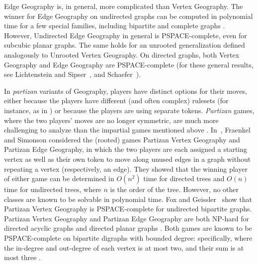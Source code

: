 \documentclass{article}
\theoremstyle{plain}
\theoremstyle{definition}
\begin{document}
{\sc Edge Geography} is, in general, more complicated than {\sc Vertex Geography.} The winner for {\sc Edge Geography} on undirected graphs can be computed in polynomial time for a few special families, including bipartite and complete graphs \cite{FSU93}. However, {\sc Undirected Edge Geography} in general is PSPACE-complete, even for subcubic planar graphs. The same holds for an unrooted generalization defined analogously to {\sc Unrooted Vertex Geography.} On directed graphs, both {\sc Vertex Geography} and {\sc Edge Geography} are PSPACE-complete (for these general results, see Lichtenstein and Sipser~\cite{LS80}, and Schaefer~\cite{Schaefer78}). 

In \emph{partizan} variants of Geography, players have distinct options for their moves, either because the players have different (and often complex) rulesets (for instance, as in \cite{Bosboom2020}) or because the players are using separate tokens. \emph{Partizan} games, where the two players' moves are no longer symmetric, are much more challenging to analyze than the impartial games mentioned above \cite{Conway00}. 
In~\cite{FS93}, Fraenkel and Simonson considered the (rooted) games {\sc Partizan Vertex Geography} and {\sc Partizan Edge Geography}, in which the two players are each assigned a starting vertex as well as their own token to move along unused edges in a graph without repeating a vertex (respectively, an edge).
They showed that the winning player of either game can be determined in $O(n^2)$ time for directed trees and $O(n)$ time for undirected trees, where $n$ is the order of the tree. However, no other classes are known to be solvable in polynomial time. Fox and Geissler~\cite{FG22} show that {\sc Partizan Vertex Geography} is PSPACE-complete for undirected bipartite graphs. {\sc Partizan Vertex Geography} and {\sc Partizan Edge Geography} are both NP-hard for directed acyclic graphs and directed planar graphs \cite{FS93}. Both games are known to be PSPACE-complete on bipartite digraphs with bounded degree: specifically, where the in-degree and out-degree of each vertex is at most two, and their sum is at most three \cite{FS93}.  
\end{document}
